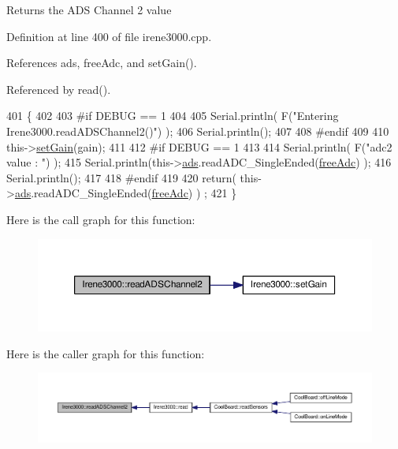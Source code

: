 \begin{DoxyReturn}{Returns}
the A\+DS Channel 2 value 
\end{DoxyReturn}


Definition at line 400 of file irene3000.\+cpp.



References ads, free\+Adc, and set\+Gain().



Referenced by read().


\begin{DoxyCode}
401 \{   
402 
403 \textcolor{preprocessor}{#if DEBUG == 1 }
404     
405     Serial.println( F(\textcolor{stringliteral}{"Entering Irene3000.readADSChannel2()"}) );
406     Serial.println();
407 
408 \textcolor{preprocessor}{#endif}
409 
410     this->\hyperlink{classIrene3000_aff7c5da186b388e7272e63ff88a20c34}{setGain}(gain);
411 
412 \textcolor{preprocessor}{#if DEBUG == 1 }
413     
414     Serial.println( F(\textcolor{stringliteral}{"adc2 value : "}) );
415     Serial.println(this->\hyperlink{classIrene3000_a1215e77ba761c9908d80d691f149e135}{ads}.readADC\_SingleEnded(\hyperlink{Irene3000_8h_a55497513af255250e464ed76543d46d7}{freeAdc}) );
416     Serial.println();
417 
418 \textcolor{preprocessor}{#endif}
419 
420     \textcolor{keywordflow}{return}( this->\hyperlink{classIrene3000_a1215e77ba761c9908d80d691f149e135}{ads}.readADC\_SingleEnded(\hyperlink{Irene3000_8h_a55497513af255250e464ed76543d46d7}{freeAdc}) ) ;
421 \}
\end{DoxyCode}
Here is the call graph for this function\+:\nopagebreak
\begin{figure}[H]
\begin{center}
\leavevmode
\includegraphics[width=350pt]{classIrene3000_ae73bd2ed14a199a7e83f4d6458476a7c_cgraph}
\end{center}
\end{figure}
Here is the caller graph for this function\+:\nopagebreak
\begin{figure}[H]
\begin{center}
\leavevmode
\includegraphics[width=350pt]{classIrene3000_ae73bd2ed14a199a7e83f4d6458476a7c_icgraph}
\end{center}
\end{figure}
\mbox{\label{classIrene3000_ae0e0a5b773c3625b44c1d113c76a1540}} 

